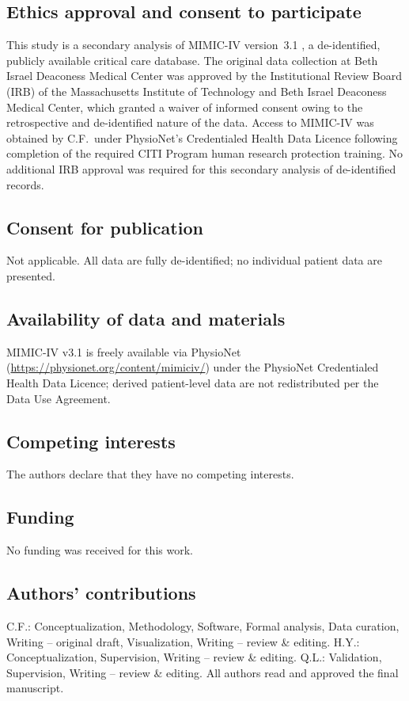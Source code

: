 \documentclass[referee,lineno,pdflatex]{sn-article-template/sn-jnl}
\begin{document}
\subsection*{Ethics approval and consent to participate}
This study is a secondary analysis of MIMIC-IV version~3.1
\cite{johnson2024mimiciv,johnson2023}, a de-identified, publicly available
critical care database.
The original data collection at Beth Israel Deaconess Medical Center was
approved by the Institutional Review Board (IRB) of the Massachusetts Institute
of Technology and Beth Israel Deaconess Medical Center, which granted a waiver
of informed consent owing to the retrospective and de-identified nature of the
data.
Access to MIMIC-IV was obtained by C.F.\ under PhysioNet's Credentialed Health
Data Licence following completion of the required CITI Program human research
protection training.
No additional IRB approval was required for this secondary analysis of
de-identified records.

\subsection*{Consent for publication}
Not applicable. All data are fully de-identified; no individual patient data
are presented.

\subsection*{Availability of data and materials}
MIMIC-IV v3.1 is freely available via PhysioNet
(\url{https://physionet.org/content/mimiciv/}) under the PhysioNet
Credentialed Health Data Licence; derived patient-level data are not
redistributed per the Data Use Agreement.

\subsection*{Competing interests}
The authors declare that they have no competing interests.

\subsection*{Funding}
\label{strobe:funding}%
No funding was received for this work.

\subsection*{Authors' contributions}
C.F.: Conceptualization, Methodology, Software, Formal analysis, Data
curation, Writing -- original draft, Visualization, Writing -- review \& editing.
H.Y.: Conceptualization, Supervision, Writing -- review \& editing.
Q.L.: Validation, Supervision, Writing -- review \& editing.
All authors read and approved the final manuscript.
\end{document}
